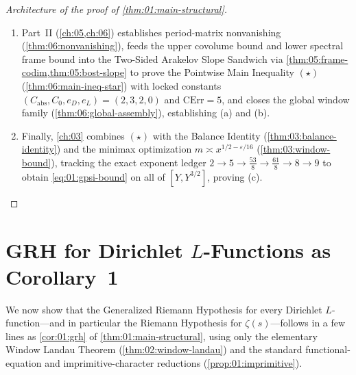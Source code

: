 \begin{proof}[Architecture of the proof of \cref{thm:01:main-structural}]
\begin{enumerate}[label=\textup{\arabic*.}]
\item Part~II (\cref{ch:05,ch:06}) establishes period-matrix nonvanishing (\cref{thm:06:nonvanishing}), feeds the upper covolume bound and lower spectral frame bound into the Two-Sided Arakelov Slope Sandwich via \cref{thm:05:frame-codim,thm:05:bost-slope} to prove the Pointwise Main Inequality $(\star)$ (\cref{thm:06:main-ineq-star}) with locked constants $(C_{\mathrm{abs}}, C_0, e_D, e_L) = (2,3,2,0)$ and $\mathrm{CErr} = 5$, and closes the global window family (\cref{thm:06:global-assembly}), establishing (a) and (b).
\item Finally, \cref{ch:03} combines $(\star)$ with the Balance Identity (\cref{thm:03:balance-identity}) and the minimax optimization $m \asymp x^{1/2-\varepsilon/16}$ (\cref{thm:03:window-bound}), tracking the exact exponent ledger $2 \to 5 \to \frac{53}{8} \to \frac{61}{8} \to 8 \to 9$ to obtain \eqref{eq:01:gpsi-bound} on all of $[Y, Y^{3/2}]$, proving (c).
\end{enumerate}
\end{proof}

\section{GRH for Dirichlet $L$-Functions as Corollary~1}
\label{sec:01:grh-corollary}

We now show that the Generalized Riemann Hypothesis for every Dirichlet $L$-function—and in particular the Riemann Hypothesis for $\zeta(s)$—follows in a few lines as \cref{cor:01:grh} of \cref{thm:01:main-structural}, using only the elementary Window Landau Theorem (\cref{thm:02:window-landau}) and the standard functional-equation and imprimitive-character reductions (\cref{prop:01:imprimitive}).

